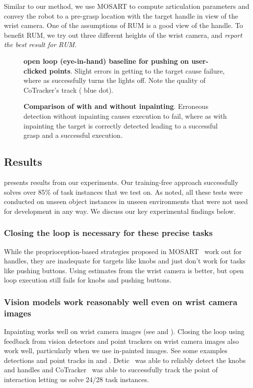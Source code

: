 Similar to our method, we use MOSART to compute articulation
parameters and convey the robot to a pre-grasp location
with the target handle in view of the wrist camera.
One of the assumptions of RUM is a good view of the handle.
To benefit RUM, we try out three different heights of the wrist camera,
and \textit{report the best result for RUM.}

\begin{figure*}
\caption{{\bf \name \vs open loop (eye-in-hand) baseline for pushing on user-clicked points}. Slight errors in getting to the target cause failure, where as \name successfully turns the lights off. Note the quality of CoTracker's track ({\color{blue} blue dot}).}
\end{figure*}

\begin{figure*}
\caption{{\bf Comparison of \name with and without inpainting}. Erroneous detection without inpainting causes execution to fail, where as with inpainting the target is correctly detected leading to a successful grasp and a successful execution.}
\end{figure*}


\subsection{Results}
 presents results from our experiments. 
Our training-free approach \name successfully 
solves over 85\% of task instances that we test on.
As noted, all these
tests were conducted on unseen object instances in unseen
environments that were not used for development in any way. We discuss our key
experimental findings below.

\subsubsection{Closing the loop is necessary for these precise tasks} 
While the proprioception-based strategies proposed in MOSART~\cite{gupta2024opening}
work out for handles, they are inadequate for targets like knobs and just
don't work for tasks like pushing buttons. Using estimates from the wrist
camera is better, but open loop execution still fails for knobs and pushing
buttons. 

\subsubsection{Vision models work reasonably well even on wrist camera images}
Inpainting works well on wrist camera images (see  and ).
Closing the loop using feedback from vision detectors and point trackers on
wrist camera images also work well, particularly when we use in-painted images.
See some examples detections and point tracks in  and . 
Detic~\cite{zhou2022detecting} was able to reliably detect the knobs and
handles and CoTracker~\cite{karaev2023cotracker} was able to successfully track
the point of interaction letting us solve 24/28 task instances.

